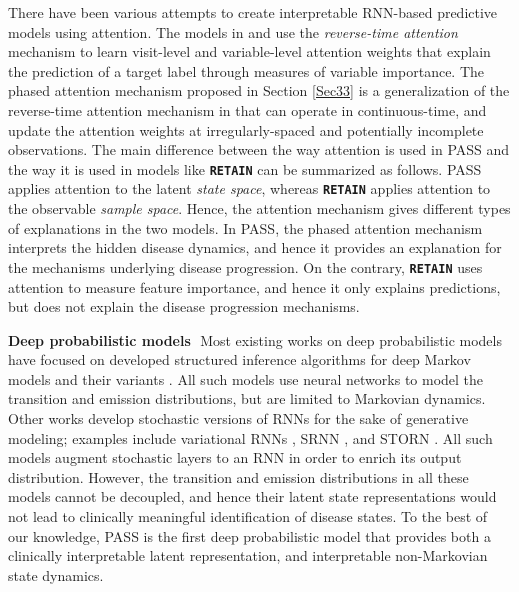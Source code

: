 \documentclass[twoside,11pt]{article}
\begin{document}
There have been various attempts to create interpretable RNN-based predictive models using attention. The models in  \cite{choi2016retain} and \cite{ma2017dipole} use the {\it reverse-time attention} mechanism to learn visit-level and variable-level attention weights that explain the prediction of a target label through measures of variable importance. The phased attention mechanism proposed in Section \ref{Sec33} is a generalization of the reverse-time attention mechanism in \cite{choi2016retain} that can operate in continuous-time, and update the attention weights at irregularly-spaced and potentially incomplete observations. The main difference between the way attention is used in PASS and the way it is used in models like \textbf{\texttt{\small RETAIN}} \cite{choi2016retain} can be summarized as follows. PASS applies attention to the latent {\it state space}, whereas \textbf{\texttt{\small RETAIN}} applies attention to the observable {\it sample space}. Hence, the attention mechanism gives different types of explanations in the two models. In PASS, the phased attention mechanism interprets the hidden disease dynamics, and hence it provides an explanation for the mechanisms underlying disease progression. On the contrary, \textbf{\texttt{\small RETAIN}} uses attention to measure feature importance, and hence it only explains predictions, but does not explain the disease progression mechanisms.  

{\bf Deep probabilistic models}\,\, Most existing works on deep probabilistic models have focused on developed structured inference algorithms for deep Markov models and their variants \cite{krishnan2017structured,dai2016recurrent,karl2016deep,johnson2016composing}. All such models use neural networks to model the transition and emission distributions, but are limited to Markovian dynamics. Other works develop stochastic versions of RNNs for the sake of generative modeling; examples include variational RNNs \cite{chung2015recurrent}, SRNN \cite{fraccaro2016sequential}, and STORN \cite{bayer2014learning}. All such models augment stochastic layers to an RNN in order to enrich its output distribution. However, the transition and emission distributions in all these models cannot be decoupled, and hence their latent state representations would not lead to clinically meaningful identification of disease states. To the best of our knowledge, PASS is the first deep probabilistic model that provides both a clinically interpretable latent representation, and interpretable non-Markovian state dynamics. 
\end{document}
